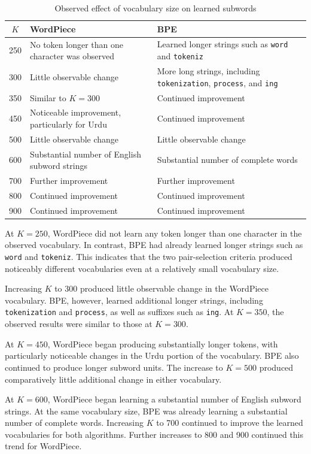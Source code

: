\documentclass[sigconf]{acmart}
\begin{document}
\begin{table}[t]
\caption{Observed effect of vocabulary size on learned subwords}
\label{tab:vocab-results}
\centering
\begin{tabular}{c|p{2.6cm}|p{2.6cm}}
\toprule
$K$ & WordPiece & BPE \\
\midrule
250 & No token longer than one character was observed & Learned longer strings such as \texttt{word} and \texttt{tokeniz} \\
300 & Little observable change & More long strings, including \texttt{tokenization}, \texttt{process}, and \texttt{ing} \\
350 & Similar to $K=300$ & Continued improvement \\
450 & Noticeable improvement, particularly for Urdu & Continued improvement \\
500 & Little observable change & Little observable change \\
600 & Substantial number of English subword strings & Substantial number of complete words \\
700 & Further improvement & Further improvement \\
800 & Continued improvement & Continued improvement \\
900 & Continued improvement & Continued improvement \\
\bottomrule
\end{tabular}
\end{table}

At \(K=250\), WordPiece did not learn any token longer than one
character in the observed vocabulary. In contrast, BPE had already
learned longer strings such as \texttt{word} and \texttt{tokeniz}.
This indicates that the two pair-selection criteria produced
noticeably different vocabularies even at a relatively small
vocabulary size.

Increasing \(K\) to 300 produced little observable change in the
WordPiece vocabulary. BPE, however, learned additional longer strings,
including \texttt{tokenization} and \texttt{process}, as well as
suffixes such as \texttt{ing}. At \(K=350\), the observed results were
similar to those at \(K=300\).

At \(K=450\), WordPiece began producing substantially longer tokens,
with particularly noticeable changes in the Urdu portion of the
vocabulary. BPE also continued to produce longer subword units. The
increase to \(K=500\) produced comparatively little additional change
in either vocabulary.

At \(K=600\), WordPiece began learning a substantial number of English
subword strings. At the same vocabulary size, BPE was already learning
a substantial number of complete words. Increasing \(K\) to 700
continued to improve the learned vocabularies for both algorithms.
Further increases to 800 and 900 continued this trend for WordPiece.
\end{document}
